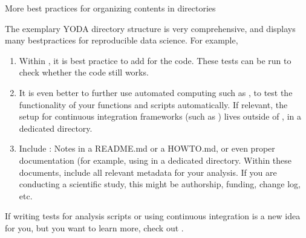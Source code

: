 \ignorespaces \begin{findoutmore}[label={fom-yodaproject}, before title={\thetcbcounter\ }, float, floatplacement=tbp, check odd page=true]{More best practices for organizing contents in directories}
\label{\detokenize{basics/101-127-yoda:fom-yodaproject}}

\sphinxAtStartPar
The exemplary YODA directory structure is very comprehensive, and displays many best\sphinxhyphen{}practices for
reproducible data science. For example,
\begin{enumerate}
%
\item {} 
\sphinxAtStartPar
Within , it is best practice to add  for the code.
These tests can be run to check whether the code still works.

\item {} 
\sphinxAtStartPar
It is even better to further use automated computing such as
,
to test the functionality of your functions and scripts automatically.
If relevant, the setup for continuous integration frameworks (such as
) lives outside of ,
in a dedicated  directory.

\item {} 
\sphinxAtStartPar
Include : Notes in a README.md or a HOWTO.md,
or even proper documentation (for example, using  in a dedicated  directory.
Within these documents, include all relevant metadata for your analysis. If you are
conducting a scientific study, this might be authorship, funding,
change log, etc.

\end{enumerate}

\sphinxAtStartPar
If writing tests for analysis scripts or using continuous integration
is a new idea for you, but you want to learn more, check out
.


\end{findoutmore}

